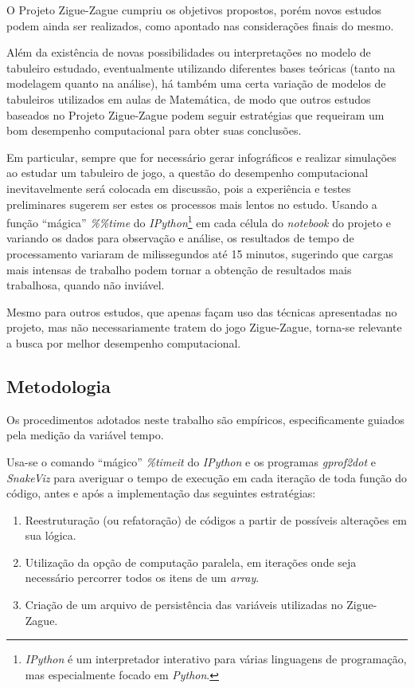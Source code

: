 \documentclass[12pt]{article}
\newcommand{\aspas}[1]{``#1''} %
\begin{document}
O Projeto Zigue-Zague cumpriu os objetivos propostos, porém novos estudos podem ainda ser realizados, como apontado nas considerações finais do mesmo.

Além da existência de novas possibilidades ou interpretações no modelo de tabuleiro estudado, eventualmente utilizando diferentes bases teóricas (tanto na modelagem quanto na análise), há também uma certa variação de modelos de tabuleiros utilizados em aulas de Matemática, de modo que outros estudos baseados no Projeto Zigue-Zague podem seguir estratégias que requeiram um bom desempenho computacional para obter suas conclusões.

Em particular, sempre que for necessário gerar infográficos e realizar simulações ao estudar um tabuleiro de jogo, a questão do desempenho computacional inevitavelmente será colocada em discussão, pois a experiência e testes preliminares sugerem ser estes os processos mais lentos no estudo. Usando a função \aspas{mágica} \textit{\%\%time} do \textit{IPython}\footnote{\textit{IPython} é um interpretador interativo para várias linguagens de programação, mas especialmente focado em \textit{Python}.} em cada célula do \textit{notebook} do projeto e variando os dados para observação e análise, os resultados de tempo de processamento variaram de milissegundos até 15 minutos, sugerindo que cargas mais intensas de trabalho podem tornar a obtenção de resultados mais trabalhosa, quando não inviável. 

Mesmo para outros estudos, que apenas façam uso das técnicas apresentadas no projeto, mas não necessariamente tratem do jogo Zigue-Zague, torna-se relevante a busca por melhor desempenho computacional.

\subsection{Metodologia}
\label{metodologia}

Os procedimentos adotados neste trabalho são empíricos, especificamente guiados pela medição da variável tempo.

Usa-se o comando \aspas{mágico} \textit{\%timeit} do \textit{IPython} e os programas \textit{gprof2dot} e \textit{SnakeViz} para averiguar o tempo de execução em cada iteração de toda função do código, antes e após a implementação das seguintes estratégias:

\begin{enumerate}
	\item \label{reestruturacao} Reestruturação (ou refatoração) de códigos a partir de possíveis alterações em sua lógica.
	
	\item \label{paralela} Utilização da opção de computação paralela, em iterações onde seja necessário percorrer todos os itens de um \textit{array}.
	
	\item \label{persistencia} Criação de um arquivo de persistência das variáveis utilizadas no Zigue-Zague.
\end{enumerate}
\end{document}
